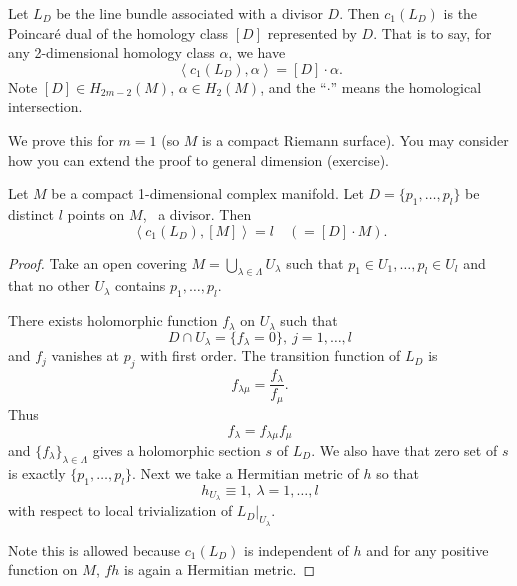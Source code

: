 \documentclass[12pt]{article}
\begin{document}
\ifdefined\FullBook{}
\begin{theorem}\label{thm:4-1:A}
\else
\begin{theorem}[A]
\fi
  Let \(L_D\) be the line bundle associated with a divisor \(D\). Then \(c_1(L_D)\) is
  the Poincaré dual of the homology class \([D]\) represented by \(D\). That is to say,
  for any 2-dimensional homology class \(\alpha\), we have \[
    \left<c_1(L_D),\alpha\right> =[D]\cdot\alpha
  .\] Note \([D]\in H_{2m-2}(M)\), \(\alpha\in H_2(M)\), and the ``\(\cdot\)'' means
  the homological intersection.
\end{theorem}

We prove this for \(m=1\) (so \(M\) is a compact Riemann surface). You may consider
how you can extend the proof to general dimension (exercise).
\begin{theorem}
  Let \(M\) be a compact 1-dimensional complex manifold. Let \(D=\{p_1,\ldots,p_l\}\)
  be distinct \(l\) points on \(M\), \ie\ a divisor. Then \[
    \left<c_1(L_D),[M]\right> =l\quad(=[D]\cdot M)
  .\] 
\end{theorem}
\begin{proof}
  Take an open covering \(M=\bigcup_{\lambda\in \Lambda}U_\lambda\) such that
  \(p_1\in U_1,\ldots,p_l\in U_l\) and that no other \(U_\lambda\) contains
  \(p_1,\ldots,p_l\).
  \begin{center}
    
  \end{center}
  There exists holomorphic function \(f_\lambda\) on \(U_\lambda\) such that \[
    D\cap U_\lambda=\{f_\lambda=0\},\ j=1,\ldots,l
  \] and \(f_j\) vanishes at \(p_j\) with first order. The transition function
  of \(L_D\) is \[
    f_{\lambda\mu}=\frac{f_\lambda}{f_\mu}
  .\] Thus \[
    f_{\lambda}=f_{\lambda\mu}f_{\mu}
  \] and \(\{f_{\lambda}\}_{\lambda\in \Lambda}\) gives a holomorphic section \(s\)
  of \(L_D\). We also have that zero set of \(s\) is exactly \(\{p_1,\ldots,p_l\}\).
  Next we take a Hermitian metric of \(h\) so that \[
    h_{U_{\lambda}}\equiv 1,\ \lambda=1,\ldots,l
  \] with respect to local trivialization of \(L_{D}\Big|_{U_{\lambda}}\).

  Note this is allowed because \(c_1(L_D)\) is independent of \(h\) and for any
  positive function on \(M\), \(fh\) is again a Hermitian metric.


\end{proof}
\end{theorem}
\end{document}
